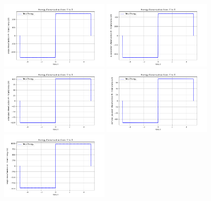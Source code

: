 \documentclass[12pt]{article}
\begin{document}
\begin{figure}[H]
    \centering
    \includegraphics[width=0.48\textwidth]{images/energy_conservation_gaussian.png}
    \includegraphics[width=0.48\textwidth]{images/energy_conservation_superposition.png} \\
    \includegraphics[width=0.48\textwidth]{images/energy_conservation_entangled.png}
    \includegraphics[width=0.48\textwidth]{images/energy_conservation_complex_gaussian.png} \\
    \includegraphics[width=0.48\textwidth]{images/energy_conservation_tunneling.png}

\end{figure}
\end{document}
